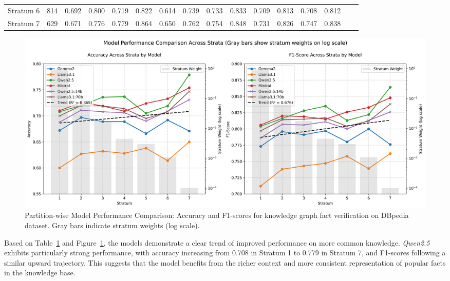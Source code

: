\begin{table}[ht!]
{\begin{tabular}{lccccccccccccccc}
            Stratum 6       & 814  & 0.692                & 0.800             & 0.719                 & 0.822                 & 0.614                   & 0.739               & 0.733                   & 0.833          & 0.709                      & 0.813               & 0.708                       & 0.812       \\
            Stratum 7       & 629  & 0.671                & 0.776             & 0.779                 & 0.864                 & 0.650                   & 0.762               & 0.754                   & 0.848          & 0.731                      & 0.826               & 0.747                       & 0.838       \\
            \bottomrule
        \end{tabular}}
    \label{tab:evaluation_results-partition-wise-dbpedia}
\end{table}

\begin{figure}[ht!]
    \centering
    \begin{minipage}[b]{\textwidth}
        \centering
        \includegraphics[width=\textwidth]{res/F1_ACC_Analysis_Across_Stratum}
    \end{minipage}
    \caption{Partition-wise Model Performance Comparison: Accuracy and F1-scores for knowledge graph fact verification on DBpedia dataset. Gray bars indicate stratum weights (log scale).}
    \label{fig:F1_ACC_Analysis_Across_Stratum}
\end{figure}

Based on Table~\ref{tab:evaluation_results-partition-wise-dbpedia} and Figure~\ref{fig:F1_ACC_Analysis_Across_Stratum}, the models demonstrate a clear trend of improved performance on more common knowledge.
\textit{Qwen2.5} exhibits particularly strong performance, with accuracy increasing from 0.708 in Stratum 1 to 0.779 in Stratum 7, and F1-scores following a similar upward trajectory.
This suggests that the model benefits from the richer context and more consistent representation of popular facts in the knowledge base.

